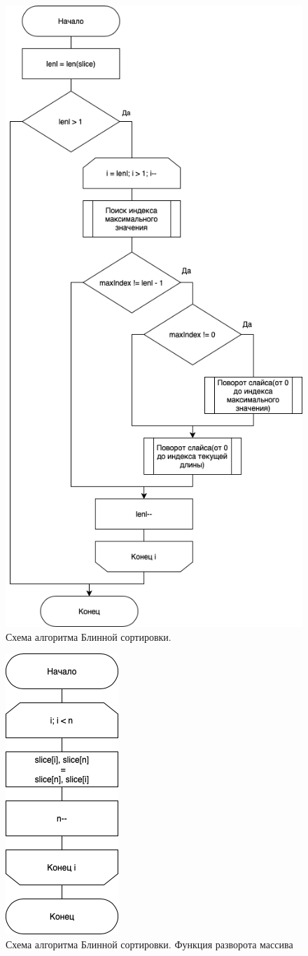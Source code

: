 \begin{figure}[h]
    \centering
    \includegraphics[width=0.5\linewidth]{img/pancake1.png}
    \caption{Схема алгоритма Блинной сортировки.}
    \label{fig:pancake}
\end{figure}

\begin{figure}[h]
    \centering
    \includegraphics[width=0.2\linewidth]{img/pancake2.png}
    \caption{Схема алгоритма Блинной сортировки. Функция разворота массива}
\end{figure}

